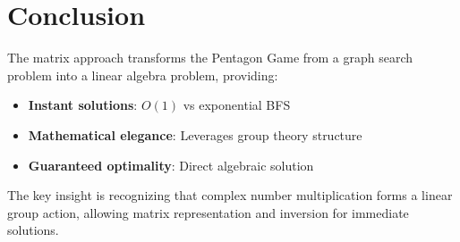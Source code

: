 \documentclass{article}
\begin{document}
\section{Conclusion}

The matrix approach transforms the Pentagon Game from a graph search problem into a linear algebra problem, providing:
\begin{itemize}
    \item \textbf{Instant solutions}: $O(1)$ vs exponential BFS
    \item \textbf{Mathematical elegance}: Leverages group theory structure
    \item \textbf{Guaranteed optimality}: Direct algebraic solution
\end{itemize}

The key insight is recognizing that complex number multiplication forms a linear group action, allowing matrix representation and inversion for immediate solutions.
\end{document}

